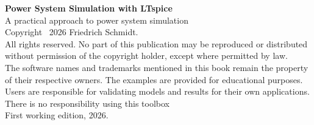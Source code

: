 \thispagestyle{empty}
\vspace*{\fill}
\noindent\textbf{Power System Simulation with LTspice}\\
A practical approach to power system simulation\\[1.5em]
Copyright \textcopyright\ 2026 Friedrich Schmidt.\\[1em]
All rights reserved. No part of this publication may be reproduced or distributed without permission of the copyright holder, except where permitted by law.\\[1em]
The software names and trademarks mentioned in this book remain the property of their respective owners. The examples are provided for educational purposes. Users are responsible for validating models and results for their own applications. There is no responsibility using this toolbox\\[2em]
First working edition, 2026.
\newpage
